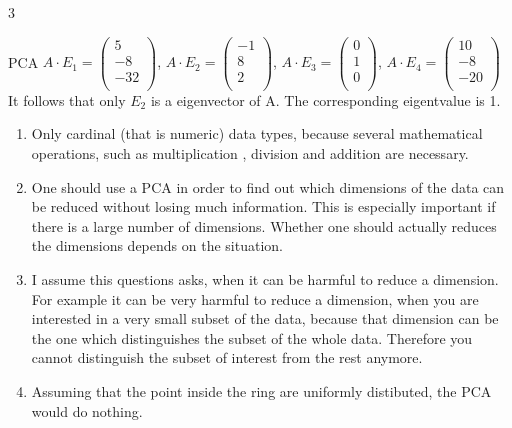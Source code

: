 \documentclass{article}
\begin{document}
    \begin{ukon-infie}[15.11.17]{3}

        \begin{exercise}[p=9]{PCA}
        	\question{}
        	{
$A \cdot E_1 = 
\left(
	\begin{array}{c}
		5\\
		-8\\
		-32\\
	\end{array}
\right)$,
$A \cdot E_2 = 
\left(
	\begin{array}{c}
		-1\\
		8\\
		2\\
	\end{array}
\right)$,
$A \cdot E_3 = 
\left(
	\begin{array}{c}
		0\\
		1\\
		0\\
	\end{array}
\right)$,
$A \cdot E_4 = 
\left(
	\begin{array}{c}
		10\\
		-8\\
		-20\\
	\end{array}
\right)$\\
It follows that only $E_2$ is a eigenvector of A. The corresponding eigentvalue is 1.
        	}
        	\question{}
        	{
        		\begin{enumerate}
        			\item Only cardinal (that is numeric) data types, because several mathematical operations, such as multiplication , division and addition are necessary.
        			\item One should use a PCA in order to find out which dimensions of the data can be reduced without losing much information. This is especially important if there is a large number of dimensions. Whether one should actually reduces the dimensions depends on the situation. 
        			\item I assume this questions asks, when it can be harmful to reduce a dimension. For example it can be very harmful to reduce a dimension, when you are interested in a very small subset of the data, because that dimension can be the one which distinguishes the subset of the whole data. Therefore you cannot distinguish the subset of interest from the rest anymore.
        			\item Assuming that the point inside the ring are uniformly distibuted, the PCA would do nothing.

\end{enumerate}}
\end{exercise}
\end{ukon-infie}
\end{document}
